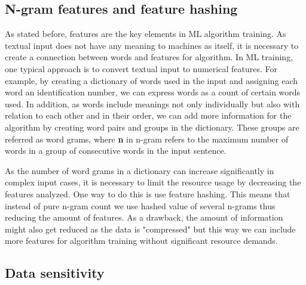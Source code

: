 \subsection{N-gram features and feature hashing}\label{subsec:bg-ngram-features}

As stated before, %
features are the key elements in ML algorithm training.
As textual input does not have any meaning to machines as itself,
it is necessary to create a connection between words and features for algorithm.
In ML training, one typical approach is to convert textual input to numerical features.
For example, by creating a dictionary of words used in the input
and assigning each word an identification number,
we can express words as a count of certain words used.
In addition,
as words include meanings not only individually but also
with relation to each other and in their order, %
we can add more information for the algorithm
by creating word pairs and groups in the dictionary.
These groups are referred as word grams,
where \textbf{n} in n-gram refers to the maximum number of words
in a group of consecutive words in the input sentence.



As the number of word grams in a dictionary can increase significantly
in complex input cases,
it is necessary to limit the resource usage by decreasing the features analyzed.
One way to do this is use feature hashing.
This means that instead of pure n-gram count
we use hashed value of several n-grams
thus reducing the amount of features.
As a drawback,
the amount of information might also get reduced as the data is "compressed"
but this way we can include more features for algorithm training
without significant resource demands.



\subsection{Data sensitivity}\label{subsec:bg-data-sensitivity}

